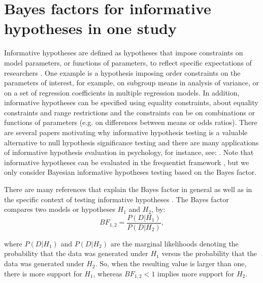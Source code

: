 \documentclass[11pt,reqno]{article}
\begin{document}
\section{Bayes factors for informative hypotheses in one study}
\label{theory}

Informative hypotheses are defined as hypotheses that impose constraints on model parameters, or functions of parameters, to reflect specific expectations of researchers \citep{hoijtink_informative_2012}. One example is a hypothesis imposing order constraints on the parameters of interest, for example, on subgroup means in analysis of variance, or on a set of regression coefficients in multiple regression models. In addition, informative hypotheses can be specified using equality constraints, about equality constraints and range restrictions and the constraints can be on combinations or functions of parameters (e.g. on differences between means or odds ratios). There are several papers motivating why informative hypothesis testing is a valuable alternative to null hypothesis significance testing \citep[NHST;][]{beland2012informative, vanrossum_hypothesis_2013, klugkist_confirmatory_2014, regenwetter_cavagnaro_2019} and there are many applications of informative hypothesis evaluation in psychology, for instance, see: \citet{cooper_relationship_2014, bullens_role_2011, vanuijlen_approach_behavior_2017, flore_influence_2018, matthijssen_effects_2019}.
Note that informative hypotheses can be evaluated in the frequentist framework \citep[e.g.,][]{silvapulle_sen_2004, kuiper_goric_2011, altinisik_gorica_2021}, but we only consider Bayesian informative hypotheses testing based on the Bayes factor.

There are many references that explain the Bayes factor in general \citep{kass_raftery_bayes_factors_1995, hoijtink_tutorial_2019, heck_review_2022} as well as in the specific context of testing informative hypotheses \citep[e.g.,][]{klugkist_inequality_2005, gu_inequality_2014, hoijtink_informative_2012}. The Bayes factor compares two models or hypotheses $H_1$ and $H_2$, by:
\begin{equation*}
  BF_{1,2} = \frac{P(D|H_1)}{P(D|H_2)},
\end{equation*}

\noindent where $P(D|H_1)$ and $P(D|H_2)$ are the marginal likelihoods denoting the probability that the data was generated under $H_1$ versus the probability that the data was generated under $H_2$. So, when the resulting value is larger than one, there is more support for $H_1$, whereas $BF_{1,2}<1$ implies more support for $H_2$.
\end{document}
